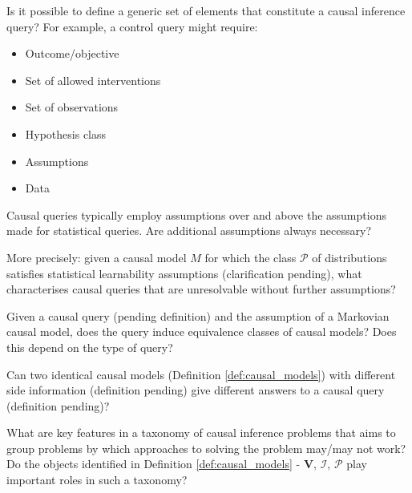 \begin{question}
    Is it possible to define a generic set of elements that constitute a causal inference query? For example, a control query might require:
    \begin{itemize}
        \item Outcome/objective
        \item Set of allowed interventions
        \item Set of observations
        \item Hypothesis class
        \item Assumptions
        \item Data
    \end{itemize}
\end{question}

\begin{question}
    Causal queries typically employ assumptions over and above the assumptions made for statistical queries. Are additional assumptions always necessary?
    
    More precisely: given a causal model $M$ for which the class $\mathcal{P}$ of distributions satisfies statistical learnability assumptions (clarification pending), what characterises causal queries that are unresolvable without further assumptions?
\end{question}

\begin{question}\label{q:query_set_of_models}
    Given a causal query (pending definition) and the assumption of a Markovian causal model, does the query induce equivalence classes of causal models? Does this depend on the type of query?
\end{question}

\begin{question}
    Can two identical causal models (Definition \ref{def:causal_models}) with different side information (definition pending) give different answers to a causal query (definition pending)?
\end{question}

\begin{question}
    What are key features in a taxonomy of causal inference problems that aims to group problems by which approaches to solving the problem may/may not work? Do the objects identified in Definition \ref{def:causal_models} - $\mathbf{V}$, $\mathcal{I}$, $\mathcal{P}$ play important roles in such a taxonomy?
\end{question}

